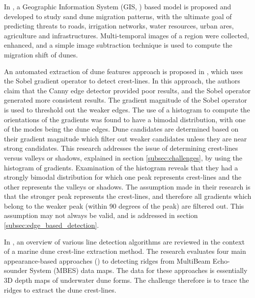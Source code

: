 In \cite{2012_automated_extraction_sand_dunes_egypt}, a Geographic Information System (GIS, \cite{gis_article}) based model is proposed and developed to study sand dune migration patterns, with the ultimate goal of predicting threats to roads, irrigation networks, water resources, urban ares, agriculture and infrastructures. Multi-temporal images of a region were collected, enhanced, and a simple image subtraction technique is used to compute the migration shift of dunes.

An automated extraction of dune features approach is proposed in \cite{2015_automated_mapping_of_linear_dunefield}, which uses the Sobel gradient operator to detect crest-lines. In this approach, the authors claim that the Canny edge detector provided poor results, and the Sobel operator generated more consistent results. The gradient magnitude of the Sobel operator is used to threshold out the weaker edges. The use of a histogram to compute the orientations of the gradients was found to have a bimodal distribution, with one of the modes being the dune edges. Dune candidates are determined based on their gradient magnitude which filter out weaker candidates unless they are near strong candidates. This research addresses the issue of determining crest-lines versus valleys or shadows, explained in section \ref{subsec:challenges}, by using the histogram of gradients. Examination of the histogram reveals that they had a strongly bimodal distribution for which one peak represents crest-lines and the other represents the valleys or shadows. The assumption made in their research is that the stronger peak represents the crest-lines, and therefore all gradients which belong to the weaker peak (within 90 degrees of the peak) are filtered out. This assumption may not always be valid, and is addressed in section \ref{subsec:edge_based_detection}.

In \cite{2016_comparisons_crest_line_extraction_marine_dunes}, an overview of various line detection algorithms are reviewed in the context of a marine dune crest-line extraction method. The research evaluates four main appearance-based approaches (\cite{2005_topology_driven_algorithms_for_ridge_extraction,2005_smooth_feature_lines_surface_meshes,2004_ridge_valley_lines_meshes_surface_fitting}) to detecting ridges from MultiBeam Echo-sounder System (MBES) data maps. The data for these approaches is essentially 3D depth maps of underwater dune forms. The challenge therefore is to trace the ridges to extract the dune crest-lines.


